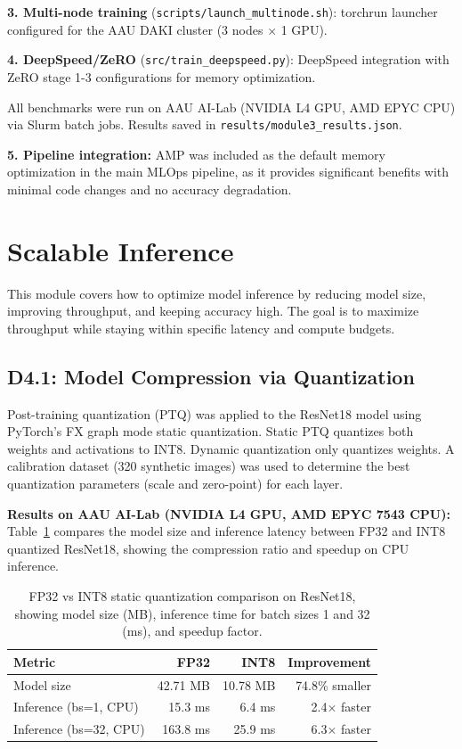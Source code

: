 \documentclass[10pt,twocolumn,letterpaper]{article}
\begin{document}
\textbf{3. Multi-node training} (\texttt{scripts/launch\_multinode.sh}): torchrun launcher configured for the AAU DAKI cluster (3 nodes $\times$ 1 GPU).

\textbf{4. DeepSpeed/ZeRO} (\texttt{src/train\_deepspeed.py}): DeepSpeed integration with ZeRO stage 1-3 configurations for memory optimization.

All benchmarks were run on AAU AI-Lab (NVIDIA L4 GPU, AMD EPYC CPU) via Slurm batch jobs. Results saved in \texttt{results/module3\_results.json}.

\textbf{5. Pipeline integration:} AMP was included as the default memory optimization in the main MLOps pipeline, as it provides significant benefits with minimal code changes and no accuracy degradation.

\section{Scalable Inference}\label{sec:scalable-inference}

This module covers how to optimize model inference by reducing model size, improving throughput, and keeping accuracy high. The goal is to maximize throughput while staying within specific latency and compute budgets.

\subsection{D4.1: Model Compression via Quantization}

Post-training quantization (PTQ) was applied to the ResNet18 model using PyTorch's FX graph mode static quantization. Static PTQ quantizes both weights and activations to INT8. Dynamic quantization only quantizes weights. A calibration dataset (320 synthetic images) was used to determine the best quantization parameters (scale and zero-point) for each layer.

\textbf{Results on AAU AI-Lab (NVIDIA L4 GPU, AMD EPYC 7543 CPU):}
Table~\ref{tab:quantization} compares the model size and inference latency between FP32 and INT8 quantized ResNet18, showing the compression ratio and speedup on CPU inference.

\begin{table}[h]
\centering
\caption{FP32 vs INT8 static quantization comparison on ResNet18, showing model size (MB), inference time for batch sizes 1 and 32 (ms), and speedup factor.}
\label{tab:quantization}
\begin{tabular}{@{} l r r r @{}}
\toprule
\textbf{Metric} & \textbf{FP32} & \textbf{INT8} & \textbf{Improvement} \\
\midrule
Model size & 42.71 MB & 10.78 MB & 74.8\% smaller \\
Inference (bs=1, CPU) & 15.3 ms & 6.4 ms & 2.4$\times$ faster \\
Inference (bs=32, CPU) & 163.8 ms & 25.9 ms & 6.3$\times$ faster \\
\bottomrule
\end{tabular}
\end{table}
\end{document}
